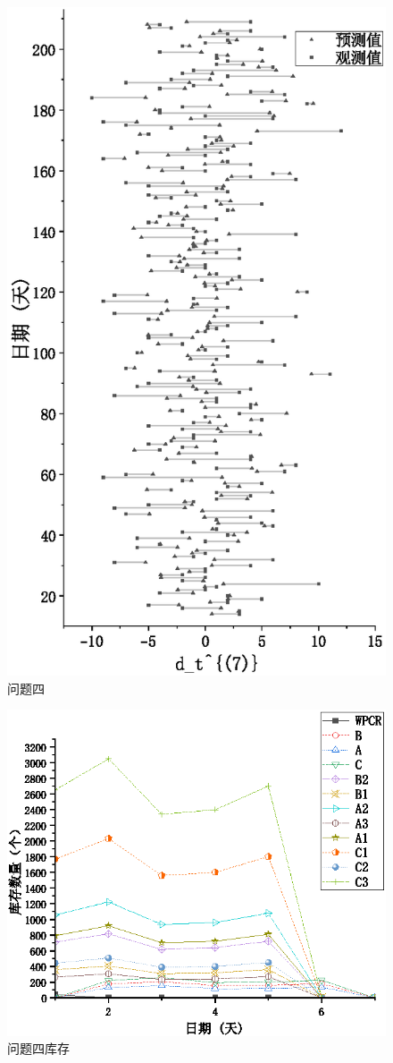\begin{figure}[!htbp]
	\centering
	\includegraphics{Image/问题四展示.eps}
	\caption{问题四}\label{问题四}
\end{figure}

\begin{figure}[!htbp]
	\centering
	\includegraphics{Image/问题四库存.eps}
	\caption{问题四库存}\label{问题四库存}
\end{figure}

